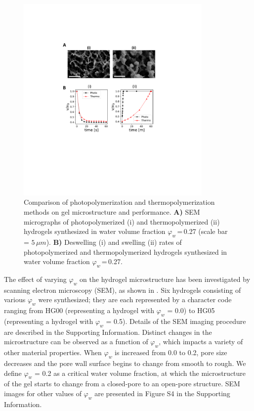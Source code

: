 \begin{figure}[!ht]
\centering
\includegraphics[width=0.85\textwidth]{photothermo.pdf}
\caption[Microstructure of thermopolymerized and photopolymerized gels ]{Comparison of photopolymerization and thermopolymerization methods on gel microstructure and performance.
\textbf{A)} SEM micrographs of photopolymerized (i) and thermopolymerized (ii) hydrogels synthesized in water volume fraction \(\varphi_{w}\)\,=\,0.27 (scale bar = $5\,\mu m$). \textbf{B)} Deswelling (i) and swelling (ii) rates of photopolymerized and thermopolymerized hydrogels synthesized in water volume fraction \(\varphi_{w}\)\,=\,0.27.}
\label{fig:photothermo}
\end{figure}

The effect of varying \(\varphi_{w}\) on the hydrogel microstructure has been investigated by scanning electron microscopy (SEM), as shown in . Six hydrogels consisting of various \(\varphi_{w}\) were synthesized; they are each represented by a character code ranging from HG00 (representing a hydrogel with \(\varphi_{w}\) = 0.0) to HG05 (representing a hydrogel with \(\varphi_{w}\) = 0.5). Details of the SEM imaging procedure are described in the Supporting Information. Distinct changes in the microstructure can be observed as a function of \(\varphi_{w}\), which impacts a variety of other material properties. When \(\varphi_{w}\) is increased from 0.0 to 0.2, pore size decreases and the pore wall surface begins to change from smooth to rough. We define \(\varphi_{w}\) = 0.2 as a critical water volume fraction, at which the microstructure of the gel starts to change from a closed-pore to an open-pore structure. SEM images for other values of \(\varphi_{w}\) are presented in Figure S4 in the Supporting Information.

